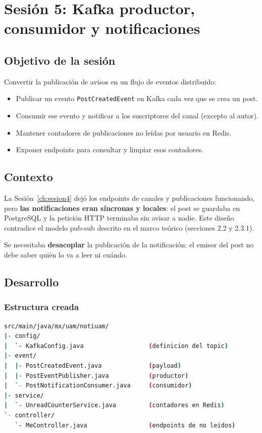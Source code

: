\chapter{Sesión 5: Kafka productor, consumidor y notificaciones}
\label{ch:sesion5}

\section{Objetivo de la sesión}

Convertir la publicación de avisos en un flujo de eventos distribuido:

\begin{itemize}[leftmargin=*]
  \item Publicar un evento \texttt{PostCreatedEvent} en Kafka cada vez que se crea un post.
  \item Consumir ese evento y notificar a los suscriptores del canal (excepto al autor).
  \item Mantener contadores de publicaciones no leídas por usuario en Redis.
  \item Exponer endpoints para consultar y limpiar esos contadores.
\end{itemize}

\section{Contexto}

La Sesión~\ref{ch:sesion4} dejó los endpoints de canales y publicaciones funcionando, pero \textbf{las notificaciones eran síncronas y locales}: el post se guardaba en PostgreSQL y la petición HTTP terminaba sin avisar a nadie. Este diseño contradice el modelo pub-sub descrito en el marco teórico (secciones 2.2 y 2.3.1).

Se necesitaba \textbf{desacoplar} la publicación de la notificación: el emisor del post no debe saber quién lo va a leer ni cuándo.

\section{Desarrollo}

\subsection{Estructura creada}

\begin{lstlisting}[language=bash]
src/main/java/mx/uam/notiuam/
|- config/
|  `- KafkaConfig.java                  (definicion del topic)
|- event/
|  |- PostCreatedEvent.java             (payload)
|  |- PostEventPublisher.java           (productor)
|  `- PostNotificationConsumer.java     (consumidor)
|- service/
|  `- UnreadCounterService.java         (contadores en Redis)
`- controller/
   `- MeController.java                 (endpoints de no leidos)
\end{lstlisting}

